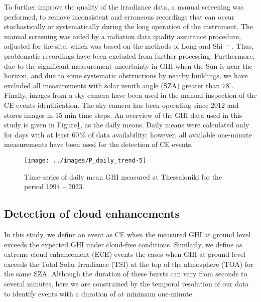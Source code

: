 \documentclass[preprint, 5p,
authoryear]{elsarticle} %
\providecommand{\DIFaddtex}[1]{{\protect\color{blue}\uwave{#1}}} %
\providecommand{\DIFdeltex}[1]{{\protect\color{red}\sout{#1}}}                      %
\providecommand{\DIFaddbegin}{} %
\providecommand{\DIFaddend}{} %
\providecommand{\DIFdelbegin}{} %
\providecommand{\DIFdelend}{} %
\providecommand{\DIFadd}[1]{\texorpdfstring{\DIFaddtex{#1}}{#1}} %
\providecommand{\DIFdel}[1]{\texorpdfstring{\DIFdeltex{#1}}{}} %
\newcommand{\DIFscaledelfig}{0.5}
\newlength{\DIFdelgraphicswidth} %
\newlength{\DIFdelgraphicsheight} %
\newcommand{\DIFaddincludegraphics}[2][]{{\color{blue}\fbox{\DIFOincludegraphics[#1]{#2}}}} %
\newcommand{\DIFdelincludegraphics}[2][]{%
\sbox{\DIFdelgraphicsbox}{\DIFOincludegraphics[#1]{#2}}%
\settoboxwidth{\DIFdelgraphicswidth}{\DIFdelgraphicsbox} %
\settoboxtotalheight{\DIFdelgraphicsheight}{\DIFdelgraphicsbox} %
\scalebox{\DIFscaledelfig}{%
\parbox[b]{\DIFdelgraphicswidth}{\usebox{\DIFdelgraphicsbox}\\[-\baselineskip] \rule{\DIFdelgraphicswidth}{0em}}\llap{\resizebox{\DIFdelgraphicswidth}{\DIFdelgraphicsheight}{%
\setlength{\unitlength}{\DIFdelgraphicswidth}%
\begin{picture}(1,1)%
\thicklines\linethickness{2pt} %
{\color[rgb]{1,0,0}\put(0,0){\framebox(1,1){}}}%
{\color[rgb]{1,0,0}\put(0,0){\line( 1,1){1}}}%
{\color[rgb]{1,0,0}\put(0,1){\line(1,-1){1}}}%
\end{picture}%
}\hspace*{3pt}}} %
} %
\DeclareRobustCommand{\DIFaddbegin}{\DIFOaddbegin \let\includegraphics\DIFaddincludegraphics} %
\DeclareRobustCommand{\DIFaddend}{\DIFOaddend \let\includegraphics\DIFOincludegraphics} %
\DeclareRobustCommand{\DIFdelbegin}{\DIFOdelbegin \let\includegraphics\DIFdelincludegraphics} %
\DeclareRobustCommand{\DIFdelend}{\DIFOaddend \let\includegraphics\DIFOincludegraphics} %
\begin{document}
To further improve the quality of the irradiance data, a manual
screening was performed, to remove inconsistent and erroneous recordings
that can occur stochastically or systematically during the long
operation of the instrument. The manual screening was aided by a
radiation data quality assurance procedure, adjusted for the site, which
was based on the methods of Long and
Shi~\DIFdelbegin \DIFdel{\mbox{%
\citep{Long2006, Long2008a}}\hskip0pt%
}\DIFdelend \DIFaddbegin \DIFadd{\mbox{%
\citetext{\citeyear{Long2006}; \citeyear{Long2008a}}}\hskip0pt%
}\DIFaddend . Thus,
problematic recordings have been excluded from further processing.
Furthermore, due to the significant measurement uncertainty in GHI when
the Sun is near the horizon, and due to some systematic obstructions by
nearby buildings, we have excluded all measurements with solar zenith
angle (SZA) greater than \(78^\circ\). Finally, images from a sky camera
have been used in the manual inspection of the CE events identification.
The sky camera has been operating since 2012 and stores images in 15 min
time steps. An overview of the GHI data used in this study is given in
Figure\nobreakspace{}\ref{fig:CLB-daily}, as the daily means. Daily
means were calculated only for days with at least \(60\,\%\) of data
availability; however, all available one-minute measurements have been
used for the detection of CE events.

\begin{figure}

{\centering \texttt{[image: ../images/P\_daily\_trend-5]} 

}

\caption{Time-series of daily mean GHI measured at Thessaloniki for the period 1994 -- 2023.}\label{fig:CLB-daily}
\end{figure}

\hypertarget{detection-of-cloud-enhancements}{%
\subsection{Detection of cloud
enhancements}\label{detection-of-cloud-enhancements}}

In this study, we define an event as CE when the measured GHI at ground
level exceeds the expected GHI under cloud-free conditions. Similarly,
we define as extreme cloud enhancement (ECE) events the cases when GHI
at ground level exceeds the Total Solar Irradiance (TSI) at the top of
the atmosphere (TOA) for the same SZA. Although the duration of these
bursts can vary from seconds to several minutes, here we are constrained
by the temporal resolution of our data to identify events with a
duration of at minimum one-minute.
\end{document}
